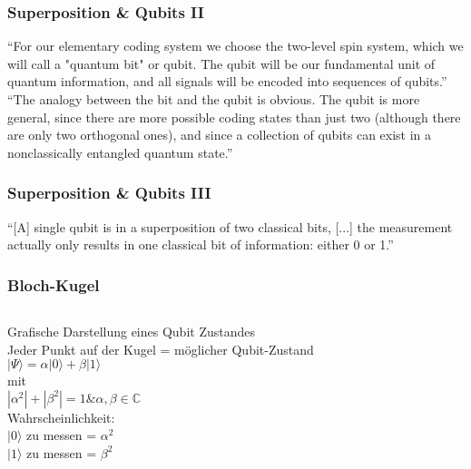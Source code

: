 \begin{frame}
	\frametitle{Superposition \& Qubits II}
	\begin{definition}
		\justifying
		\enquote{For our elementary coding system we choose the two-level spin system, which we will call a "quantum bit" or qubit. The qubit will be our fundamental unit of quantum information, and all signals will be encoded into sequences of qubits.}\cite{Schumacher1995}
		\\
		\enquote{The analogy between the bit and the qubit is obvious. The qubit is more general, since there are more possible coding states than just two (although there are only two orthogonal ones), and since a collection of qubits can exist in a nonclassically entangled quantum state.}\cite{Schumacher1995}
	\end{definition}
\end{frame}

\begin{frame}
	\frametitle{Superposition \& Qubits III}
	\begin{definition}
		\justifying
		\enquote{[A] single qubit is in a superposition of two classical bits, [...] the measurement actually only results in one classical bit of information: either 0 or 1.}\cite{Hughes2021}
	\end{definition}
\end{frame}

\begin{frame}
	\frametitle{Bloch-Kugel}
	\begin{columns}
		\begin{column}{0.6\linewidth}
			Grafische Darstellung eines Qubit Zustandes\\
			\vspace{0.5em}
			Jeder Punkt auf der Kugel = möglicher Qubit-Zustand\\
			\vspace{0.5em}
			$|\Psi\rangle = \alpha|0\rangle + \beta|1\rangle$\\
			{\centering mit}\\
			$|\alpha^2| + |\beta^2| = 1 \& \alpha, \beta \in {\displaystyle\mathbb{C}}$\\
			\vspace{0.5em}
			Wahrscheinlichkeit:\\
			$|0\rangle$ zu messen = $\alpha^2$\\
			$|1\rangle$ zu messen = $\beta^2$\\
		\end{column}
		\begin{column}{0.39\linewidth}
		\end{column}
	\end{columns}
\end{frame}

